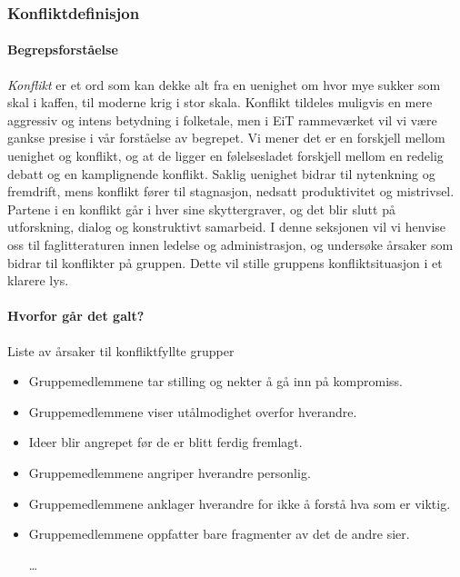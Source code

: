 \subsubsection{Konfliktdefinisjon}

\paragraph{Begrepsforståelse}
\emph{Konflikt} er et ord som kan dekke alt fra en uenighet om hvor mye sukker som skal i kaffen, til moderne krig i stor skala. Konflikt tildeles muligvis en mere aggressiv og intens betydning i folketale, men i EiT rammeværket vil vi være gankse presise i vår forståelse av begrepet. Vi mener det er en forskjell mellom uenighet og konflikt, og at de ligger en følelsesladet forskjell mellom en redelig debatt og en kamplignende konflikt. Saklig uenighet bidrar til nytenkning og fremdrift, mens konflikt fører til stagnasjon, nedsatt produktivitet og mistrivsel\cite{ledernytt}. Partene i en konflikt går i hver sine skyttergraver, og det blir slutt på utforskning, dialog og konstruktivt samarbeid. I denne seksjonen vil vi henvise oss til faglitteraturen innen ledelse og administrasjon, og undersøke årsaker som bidrar til konflikter på gruppen. Dette vil stille gruppens konfliktsituasjon i et klarere lys. 


\paragraph{Hvorfor går det galt?}




Liste av årsaker til konfliktfyllte grupper\cite[p.~253]{orgorg}

\begin{itemize}

  \item Gruppemedlemmene tar stilling og nekter å gå inn på kompromiss.
  \item Gruppemedlemmene viser utålmodighet overfor hverandre.  
  \item Ideer blir angrepet før de er blitt ferdig fremlagt.
  \item Gruppemedlemmene angriper hverandre personlig.
  \item Gruppemedlemmene anklager hverandre for ikke å forstå hva som er viktig.
  \item Gruppemedlemmene oppfatter bare fragmenter av det de andre sier.  

\ldots
\end{itemize}